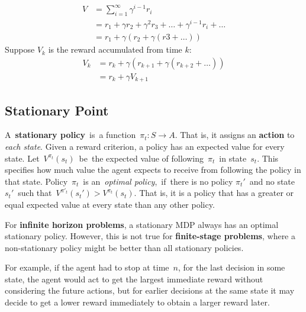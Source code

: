 \begin{enumerate}[leftmargin=*]
\begin{equation*}
\begin{split}
     V &= \sum_{i=1}^\infty \gamma^{i-1}r_i\\
     &= r_1+\gamma r_2 + \gamma^2 r_3 + \dots + \gamma^{i-1}r_i + \dots\\
     &= r_1 + \gamma (r_2 + \gamma (r3 + \dots))
\end{split}
\end{equation*}
%
Suppose $V_k$ is the reward accumulated from time $k$:
\begin{equation*}
    \begin{split}
    V_k &= r_k + \gamma(r_{k+1} + \gamma(r_{k+2} + \dots))\\
    &= r_k + \gamma V_{k+1}
    \end{split}
\end{equation*}

\end{enumerate}

\subsection{Stationary Point}
A \textbf{stationary policy} is a function $\pi_t:S \rightarrow A$. That is, it assigns an \textbf{action} to \textit{each state}.
Given a reward criterion, a policy has an expected value for every state.
Let $V^{\pi_t}(s_t)$ be the expected value of following $\pi_t$ in state $s_t$. This specifies how much value the agent expects to receive from following the policy in that state.
Policy $\pi_t$ is an \textit{optimal policy}, if there is no policy $\pi_t'$ and no state $s_t'$ such that $V^{\pi'_t}(s_t')>V^{\pi_t}(s_t)$.
That is, it is a policy that has a greater or equal expected value at every state than any other policy.

For \textbf{infinite horizon problems}, a stationary MDP always has an optimal stationary policy.
However, this is not true for \textbf{finite-stage problems}, where a non-stationary policy might be better than all stationary policies.

\noindent For example, if the agent had to stop at time $n$, for the last decision in some state, the agent would act to get the largest immediate reward without considering the future actions, but for earlier decisions at the same state it may decide to get a lower reward immediately to obtain a larger reward later.